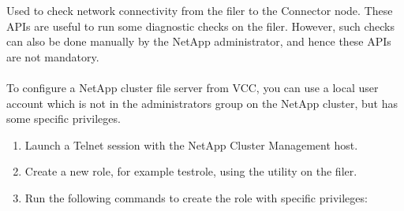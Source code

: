 \documentclass[letterpaper,10pt,english]{sphinxmanual}
\begin{document}




Used to check network connectivity from the filer to the Connector node. These APIs are useful to run some diagnostic checks on the filer. However, such checks can also be done manually by the NetApp administrator, and hence these APIs are not mandatory.


\paragraph{}
\label{\detokenize{mcdmp_app_ug:preparing-a-non-administrator-local-user-on-the-clustered-netapp-filer}}
To configure a NetApp cluster file server from VCC, you can use a local user account which is not in the administrators group on the NetApp cluster, but has some specific privileges.

\begin{enumerate}
\item {} 
Launch a Telnet session with the NetApp Cluster Management host.

\item {} 
Create a new role, for example testrole, using the  utility on the filer.

\item {} 
Run the following commands to create the role with specific privileges:

\end{enumerate}






\end{document}
